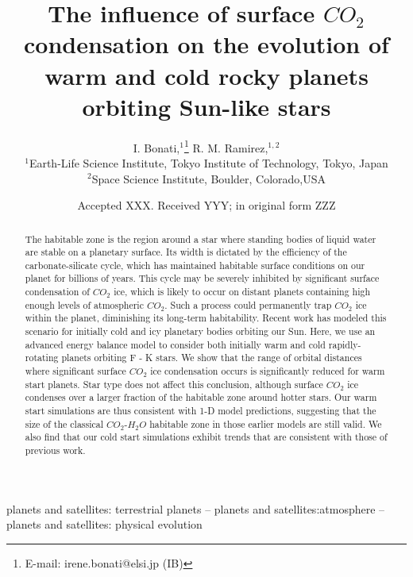 \documentclass[fleqn,usenatbib]{mnras}
\title[$CO_{\mathrm{2}}$ condensation on rocky planets]{The influence of surface $CO_{\mathrm{2}}$ condensation on the evolution of warm and cold rocky planets orbiting Sun-like stars}
\author[I. Bonati and R. Ramirez]{
I. Bonati,$^{1}$\thanks{E-mail: irene.bonati@elsi.jp (IB)}
R. M. Ramirez,$^{1,2}$
\\
$^{1}$Earth-Life Science Institute, Tokyo Institute of Technology, Tokyo, Japan\\
$^{2}$Space Science Institute, Boulder, Colorado,USA\\
}
\date{Accepted XXX. Received YYY; in original form ZZZ}
\begin{document}
\newcommand{\add}[1]{\textcolor{greenblue}{#1}}
\newcommand{\irene}[1]{\textcolor{greenblue}{\textit{(Irene: #1)}}}
\newcommand{\ramses}[1]{\textcolor{greenish}{\textit{(Ramses: #1)}}}
\newcommand{\todo}[1]{\textcolor{red}{#1}}
\newcommand{\textb}[1]{\textcolor{greenblue}{#1}}
\newcommand{\textg}[1]{\textcolor{greenish}{#1}}
\label{firstpage}
\pagerange{\pageref{firstpage}--\pageref{lastpage}}
\maketitle

\begin{abstract}
The habitable zone is the region around a star where standing bodies of liquid water are stable on a planetary surface. Its width is dictated by the efficiency of the carbonate-silicate cycle, which has maintained habitable surface conditions on our planet for billions of years. This cycle may be severely inhibited by significant surface condensation of $CO_{\mathrm{2}}$ ice, which is likely to occur on distant planets containing high enough levels of atmospheric $CO_{\mathrm{2}}$. Such a process could permanently trap $CO_{\mathrm{2}}$ ice within the planet, diminishing its long-term habitability. Recent work has modeled this scenario for initially cold and icy planetary bodies orbiting our Sun. Here, we use an advanced energy balance model to consider both initially warm and cold rapidly-rotating planets orbiting F - K stars. We show that the range of orbital distances where significant surface $CO_{\mathrm{2}}$ ice condensation occurs is significantly reduced for warm start planets. Star type does not affect this conclusion, although surface $CO_{\mathrm{2}}$ ice condenses over a larger fraction of the habitable zone around hotter stars. Our warm start simulations are thus consistent with 1-D model predictions, suggesting that the size of the classical $CO_{\mathrm{2}}$-$H_{\mathrm{2}}O$ habitable zone in those earlier models are still valid. We also find that our cold start simulations exhibit trends that are consistent with those of previous work.    
\end{abstract}

\begin{keywords}
planets and satellites: terrestrial planets -- planets and satellites:atmosphere -- planets and satellites: physical evolution
\end{keywords}
\end{document}
